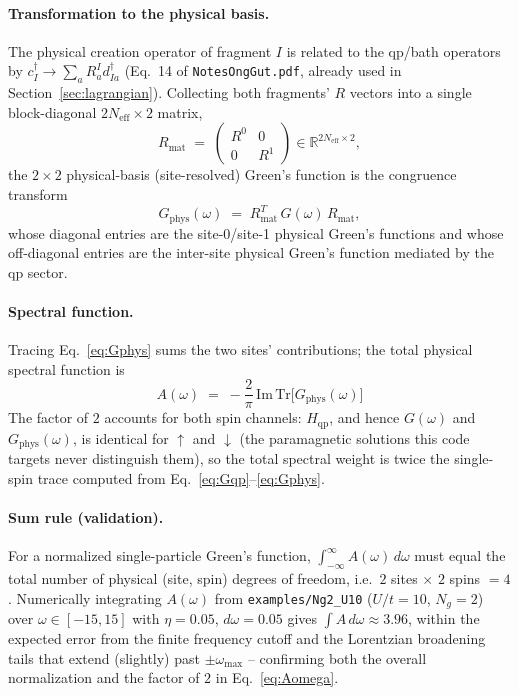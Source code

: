 \documentclass[11pt]{article}
\newcommand{\Neff}{N_{\mathrm{eff}}}
\newcommand{\Ng}{N_{g}}
\newcommand{\Hqp}{H_{\mathrm{qp}}}
\begin{document}
\paragraph{Transformation to the physical basis.} The physical creation
operator of fragment $I$ is related to the qp/bath operators by
$c^{\dagger}_I\to\sum_a R^I_a d^{\dagger}_{Ia}$ (Eq.~14 of
\texttt{NotesOngGut.pdf}, already used in Section~\ref{sec:lagrangian}).
Collecting both fragments' $R$ vectors into a single block-diagonal
$2\Neff\times2$ matrix,
\begin{equation}
  R_{\mathrm{mat}} \;=\; \begin{pmatrix} R^0 & 0 \\ 0 & R^1 \end{pmatrix}
  \in\mathbb R^{2\Neff\times2},
\end{equation}
the $2\times2$ physical-basis (site-resolved) Green's function is the
congruence transform
\begin{equation}
  G_{\mathrm{phys}}(\omega) \;=\; R_{\mathrm{mat}}^{T}\,G(\omega)\,R_{\mathrm{mat}} ,
  \label{eq:Gphys}
\end{equation}
whose diagonal entries are the site-0/site-1 physical Green's functions and
whose off-diagonal entries are the inter-site physical Green's function
mediated by the qp sector.

\paragraph{Spectral function.} Tracing Eq.~\eqref{eq:Gphys} sums the two
sites' contributions; the total physical spectral function is
\begin{equation}
  \boxed{\;A(\omega) \;=\; -\frac{2}{\pi}\,\mathrm{Im}\,\mathrm{Tr}\bigl[G_{\mathrm{phys}}(\omega)\bigr]\;}
  \label{eq:Aomega}
\end{equation}
The factor of $2$ accounts for both spin channels: $\Hqp$, and hence $G(\omega)$
and $G_{\mathrm{phys}}(\omega)$, is identical for $\uparrow$ and $\downarrow$
(the paramagnetic solutions this code targets never distinguish them), so
the total spectral weight is twice the single-spin trace computed from
Eq.~\eqref{eq:Gqp}--\eqref{eq:Gphys}.

\paragraph{Sum rule (validation).} For a normalized single-particle Green's
function, $\int_{-\infty}^{\infty}A(\omega)\,d\omega$ must equal the total
number of physical (site, spin) degrees of freedom, i.e.\ $2$ sites $\times$
$2$ spins $=4$. Numerically integrating $A(\omega)$ from
\texttt{examples/Ng2\_U10} ($U/t=10$, $\Ng=2$) over $\omega\in[-15,15]$ with
$\eta=0.05$, $d\omega=0.05$ gives $\int A\,d\omega\approx3.96$, within the
expected error from the finite frequency cutoff and the Lorentzian
broadening tails that extend (slightly) past $\pm\omega_{\max}$ -- confirming
both the overall normalization and the factor of $2$ in
Eq.~\eqref{eq:Aomega}.
\end{document}
